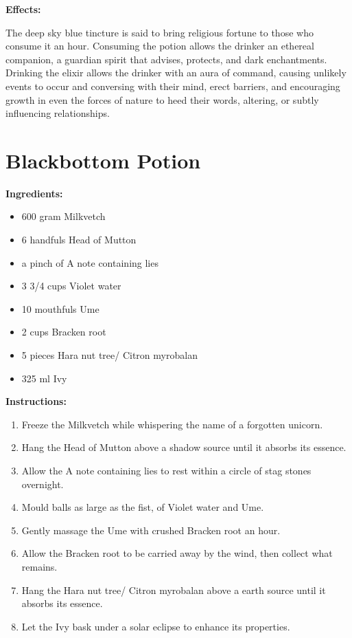 \documentclass{article}
\begin{document}
\textbf{Effects:}

The deep sky blue tincture is said to bring religious fortune to those who consume it an hour. Consuming the potion allows the drinker an ethereal companion, a guardian spirit that advises, protects, and dark enchantments. Drinking the elixir allows the drinker with an aura of command, causing unlikely events to occur and conversing with their mind, erect barriers, and encouraging growth in even the forces of nature to heed their words, altering, or subtly influencing relationships.

\newpage
\section*{Blackbottom Potion}

\textbf{Ingredients:}

\begin{itemize}
  \item 600 gram Milkvetch
  \item 6 handfuls Head of Mutton
  \item a pinch of A note containing lies
  \item 3 3/4 cups Violet water
  \item 10 mouthfuls Ume
  \item 2 cups Bracken root
  \item 5 pieces Hara nut tree/ Citron myrobalan
  \item 325 ml Ivy
\end{itemize}

\textbf{Instructions:}

\begin{enumerate}
  \item Freeze the Milkvetch while whispering the name of a forgotten unicorn.
  \item Hang the Head of Mutton above a shadow source until it absorbs its essence.
  \item Allow the A note containing lies to rest within a circle of stag stones overnight.
  \item Mould balls as large as the fist, of Violet water and Ume.
  \item Gently massage the Ume with crushed Bracken root an hour.
  \item Allow the Bracken root to be carried away by the wind, then collect what remains.
  \item Hang the Hara nut tree/ Citron myrobalan above a earth source until it absorbs its essence.
  \item Let the Ivy bask under a solar eclipse to enhance its properties.
\end{enumerate}
\end{document}
